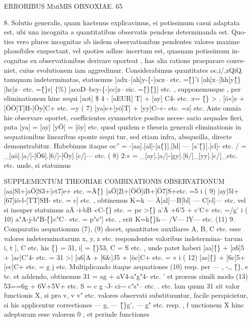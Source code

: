 \documentclass[12pt,a4paper]{article}
\begin{document}
\newpage
\begin{center}
\textsc{ERRORIBUS MmiMIS OBNOXIAE. 65}
\end{center}
8.
Solutio generalis, quam hactenus explicavimus, ei potissimum casui adaptata
est, ubi una incognita a quantitatibus observatis pendens determinanda est. Quo-
ties vero plures incognitae ab iisdem observationibus pendentes valores maxime
plausibiles exspectant, vel quoties adhuc incertum est, quasnam potissimum in-
cognitas ex observationibus derivare oporteat , has alia ratione praeparare conve-
niet, cuius evolutionem iam aggredimur.
Considerabimus quantitates oc,i/,zQiQ. tamquam indeterminatas, statuemus
[adx--[ah]y-\{-[acz-- etc. =\^\{\}'i
[ah]x--[hh]y\^\{\}[hc]z-- etc. =\^\{\}r[ \{\%)
[acoD--bcy-\{-[cc]z-- eic. =\^\{\}\^\{\}]
etc. , supponemusque , per eliminationem hinc sequi
[aot] \$ 4 - [aEUR] T] + [ay] C4- etc. :r= \^\{\} > .
[ö«]e + [ÖÖ]T]H-[Öy]C+ etc. =y  ( 7)
[ya]e+[yö]T] + [yy]C-+- etc. =z]
etc.
Ante omnia hie observare oportet, coefficientes symmetrice positos neces-
sario aequales fieri, puta
[ya] = [ay]
[yÖ] = [öy]
etc.
quod quidem e theoria generali eliminationis in aequationibus linearibus sponte
sequi tur, sed etiam infra, absqueilla, directe demonstrabitur.
Habebimus itaque
oc'' = -[aa].[al]-[a\^\{\}].[hl] --- [a'\^\{\}].[cl]- etc.
/ = \_[aö].[a/]-[Ö6].[6/]-[Öy].[c/]--- etc.  ( 8)
2:« = \_[ay].[a/]-[gy].[6/]\_[yy].[c/]\_etc.
etc.
unde, si statuimus

 SUPPLEMENTUM THEORIAE COMBINATIONIS OBSERVATIONUM
[aa]Sl+[aÖ]S3+[ct7]e+ etc. =Ä\^\{\}
[aÖ]2l+[ÖÖ]iB+[Ö7]S+etc. =5 i ( 9)
[ay]5l+[67]iö-l-[TT]SH- etc. = c]
etc. , obtinemus
K=k --- Ä[al]---B[bl] --- C[cl]--- etc.
vel si insuper statuimus
aÄ -i-bB--cC-\^\{\} etc. = pe >\^\{\}
a'Ä +6'5 + c'C+ etc. =/g' i ( 10)
a"A-j-b"B-\^\{\}c"C-- etc. = p"e"]
etc. , erit
K=k\^\{\}h--- /V--- lY--- etc. (11)
9.
Comparatio aequationum (7), (9) docet, quantitates auxiliares A, B, C etc.
esse valores indeterminatarum x, y, z etc. respondentes valoribus indetermina-
tarum i, t ], C etc. his \^\{\} = 31, i] = \^\{\}53, C = S etc. , unde patet haberi
[aa]\^\{\} + [a6]5 + [ac]C'4- etc. = 31 >|
[a6]A + [6\&]J5 + [öc]C+ etc. = « i ( 12)
[ac]\^\{\} + [6c]5+[cc]C+ etc. = g j
etc. Multiplicando itaque aequationes (10) resp. per --- , -,, \^\{\}, e tc. et addendo,
obtinemus
31 = ag + aV4-a"g"4- etc. '
et prorsus simili modo
(13)
53==6g + 6V+5V+ etc.
S = c g -J- ci-\~{} c"s"-- etc. .
etc. lam quum 31 sit valor functionis X, si pro v, v v" etc. valores observati
substituuntur, facile perspicietur, si his applicentur correctiones --- g, --- \^\{\}g', --- g"
etc. resp. , f unctionem X hinc adepturam esse valorem 0 , et perinde functiones
\end{document}
